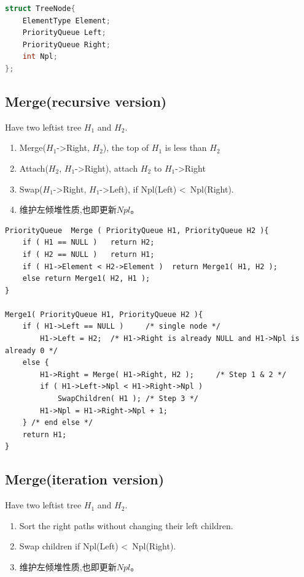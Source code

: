 \documentclass{article}
\begin{document}
\begin{lstlisting}[language=c,title={Declaration}]
struct TreeNode{
    ElementType Element;
    PriorityQueue Left;
    PriorityQueue Right;
    int Npl;
};
\end{lstlisting}

\subsection{Merge(recursive version)}
Have two leftist tree $H_1$ and $H_2$. 
\begin{enumerate}
    \item Merge($H_1$-\textgreater Right, $H_2$), the top of $H_1$ is less than $H_2$
    \item Attach($H_2$, $H_1$-\textgreater Right), attach $H_2$ to $H_1$-\textgreater Right 
    \item Swap($H_1$-\textgreater Right, $H_1$-\textgreater Left), if Npl(Left) \textless \ Npl(Right).
    \item 维护左倾堆性质,也即更新$Npl$。
\end{enumerate}

\begin{lstlisting}
PriorityQueue  Merge ( PriorityQueue H1, PriorityQueue H2 ){ 
	if ( H1 == NULL )   return H2;	
	if ( H2 == NULL )   return H1;	
	if ( H1->Element < H2->Element )  return Merge1( H1, H2 );
	else return Merge1( H2, H1 );
}

Merge1( PriorityQueue H1, PriorityQueue H2 ){ 
	if ( H1->Left == NULL ) 	/* single node */
		H1->Left = H2;	/* H1->Right is already NULL and H1->Npl is already 0 */
	else {
		H1->Right = Merge( H1->Right, H2 );     /* Step 1 & 2 */
		if ( H1->Left->Npl < H1->Right->Npl )
			SwapChildren( H1 );	/* Step 3 */
		H1->Npl = H1->Right->Npl + 1;
	} /* end else */
	return H1;
}
\end{lstlisting}

\subsection{Merge(iteration version)}
Have two leftist tree $H_1$ and $H_2$. 
\begin{enumerate}
    \item Sort the right paths without changing their left children. 
    \item Swap children if Npl(Left) \textless \ Npl(Right).
    \item 维护左倾堆性质,也即更新$Npl$。
\end{enumerate}
\end{document}
